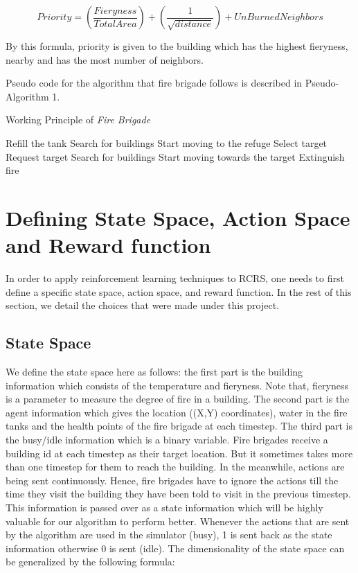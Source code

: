 \documentclass[12pt]{report}
\begin{document}
\[ Priority = (\frac{Fieryness}{Total Area}) + (\frac{1}{\sqrt{distance}}) + {UnBurnedNeighbors}  \]

By this formula, priority is given to the building which has the highest fieryness, nearby and has the most number of neighbors.

Pseudo code for the algorithm that fire brigade follows is described in Pseudo-Algorithm 1.

\begin{algorithm}
\caption{Working Principle of \emph{Fire Brigade}}
\begin{algorithmic}

\STATE  Refill the tank
\ENDIF 
{}
\STATE Search for buildings
\ENDIF
{}
\STATE Start moving to the refuge
\ENDIF
{}
\STATE Select target
\STATE Request target
\ELSE 
\STATE  Search for buildings 
\ENDIF 
\ENDIF
{}
\STATE Start moving towards the target
\ENDIF
{}
\STATE Extinguish fire
\ENDIF
\end{algorithmic}
\end{algorithm}


\section{Defining State Space, Action Space and Reward function}

In order to apply reinforcement learning techniques to RCRS, one needs to first define a specific state space, action space, and reward function. In the rest of this section, we detail the choices that were made under this project. 

\subsection{State Space}
    
We define the state space here as follows: the first part is the building information which consists of the temperature and fieryness. Note that, fieryness is a parameter to measure the degree of fire in a building. The second part is the agent information which gives the location ((X,Y) coordinates), water in the fire tanks and the health points of the fire brigade at each timestep. The third part is the busy/idle information which is a binary variable. Fire brigades receive a building id at each timestep as their target location. But it sometimes takes more than one timestep for them to reach the building. In the meanwhile, actions are being sent continuously. Hence, fire brigades have to ignore the actions till the time they visit the building they have been told to visit in the previous timestep. This information is passed over as a state information which will be highly valuable for our algorithm to perform better. Whenever the actions that are sent by the algorithm are used in the simulator (busy), 1 is sent back as the state information otherwise 0 is sent (idle). The dimensionality of the state space can be generalized by the following formula: 
\end{document}
